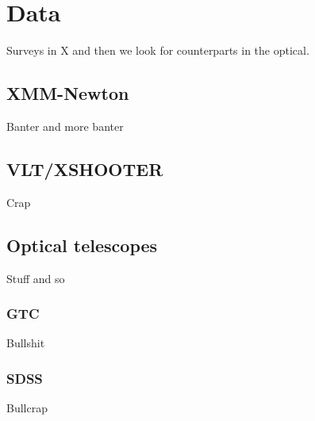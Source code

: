 
\chapter{Data} %
\label{chap:sample}

Surveys in X and then we look for counterparts in the optical. 

\section{XMM-Newton}
\label{sec2:rrhs}

Banter and more banter


\section{VLT/XSHOOTER}
\label{sec2:fhs}

Crap


\section{Optical telescopes}
\label{sec2:hsamples}

Stuff and so

\subsection{GTC}
\label{sec2:xhs}

Bullshit


\subsection{SDSS}
\label{sec2:mirhs}

Bullcrap
